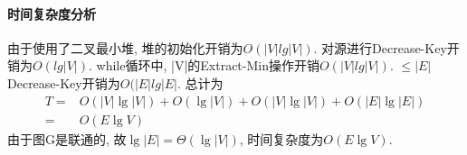 \paragraph{时间复杂度分析}
由于使用了二叉最小堆, 堆的初始化开销为$O(|V|lg|V|)$.
对源进行Decrease-Key开销为$O(lg|V|)$. while循环中,
|V|的Extract-Min操作开销$O(|V|lg|V|)$. $\leq |E|$
Decrease-Key开销为$O(|E|lg|E|$. 总计为
\begin{align}
	T = & O(|V|\lg |V|) + O(\lg |V|) + O(|V|\lg |V|) + O(|E|\lg |E|)  \nonumber \\
	=   & O(E \lg V) \nonumber
\end{align}
由于图G是联通的, 故$\lg |E| = \Theta (\lg |V|)$, 时间复杂度为$O(E\lg V)$.
